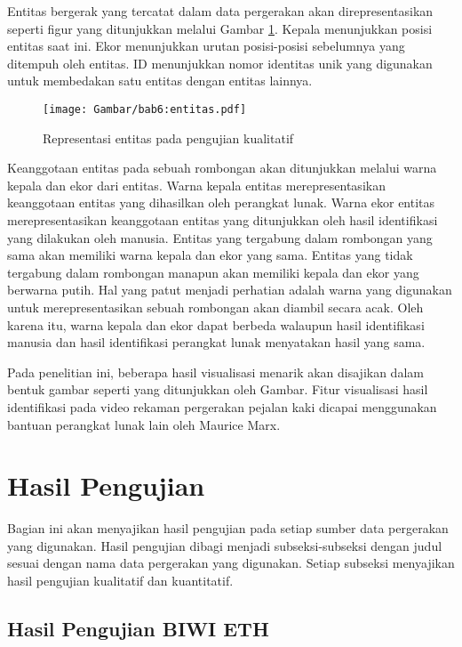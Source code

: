 Entitas bergerak yang tercatat dalam data pergerakan akan direpresentasikan seperti figur yang ditunjukkan melalui Gambar \ref{bab6:representasi-entitas}. Kepala menunjukkan posisi entitas saat ini. Ekor menunjukkan urutan posisi-posisi sebelumnya yang ditempuh oleh entitas. ID menunjukkan nomor identitas unik yang digunakan untuk membedakan satu entitas dengan entitas lainnya.

\begin{figure}[b!]
    \centering
    \texttt{[image: Gambar/bab6:entitas.pdf]}
    \caption{Representasi entitas pada pengujian kualitatif}
    \label{bab6:representasi-entitas}
\end{figure}

Keanggotaan entitas pada sebuah rombongan akan ditunjukkan melalui warna kepala dan ekor dari entitas. Warna kepala entitas merepresentasikan keanggotaan entitas yang dihasilkan oleh perangkat lunak. Warna ekor entitas merepresentasikan keanggotaan entitas yang ditunjukkan oleh hasil identifikasi yang dilakukan oleh manusia. Entitas yang tergabung dalam rombongan yang sama akan memiliki warna kepala dan ekor yang sama. Entitas yang tidak tergabung dalam rombongan manapun akan memiliki kepala dan ekor yang berwarna putih. Hal yang patut menjadi perhatian adalah warna yang digunakan untuk merepresentasikan sebuah rombongan akan diambil secara acak. Oleh karena itu, warna kepala dan ekor dapat berbeda walaupun hasil identifikasi manusia dan hasil identifikasi perangkat lunak menyatakan hasil yang sama.

Pada penelitian ini, beberapa hasil visualisasi menarik akan disajikan dalam bentuk gambar seperti yang ditunjukkan oleh Gambar. Fitur visualisasi hasil identifikasi pada video rekaman pergerakan pejalan kaki dicapai menggunakan bantuan perangkat lunak lain oleh Maurice Marx.

\section{Hasil Pengujian}
\label{sec:result}

Bagian ini akan menyajikan hasil pengujian pada setiap sumber data pergerakan yang digunakan. Hasil pengujian dibagi menjadi subseksi-subseksi dengan judul sesuai dengan nama data pergerakan yang digunakan. Setiap subseksi menyajikan hasil pengujian kualitatif dan kuantitatif.

\subsection{Hasil Pengujian BIWI ETH}
\label{subsec:eth-result}

